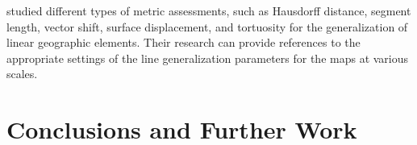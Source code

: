 \documentclass{article}
\begin{document}
\cite{stanislawski2012automated} studied different types of metric assessments,
such as Hausdorff distance, segment length, vector shift, surface displacement,
and tortuosity for the generalization of linear geographic elements. Their
research can provide references to the appropriate settings of the line
generalization parameters for the maps at various scales.


\section{Conclusions and Further Work}
\label{sec:conclusions_and_further_work}

\printbibliography
\end{document}
